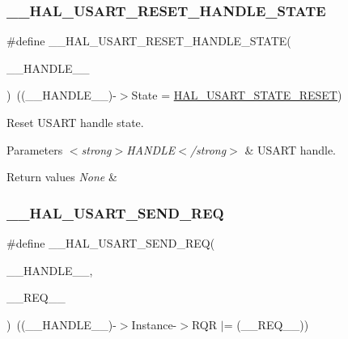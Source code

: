 \subsubsection{\texorpdfstring{\+\_\+\+\_\+\+H\+A\+L\+\_\+\+U\+S\+A\+R\+T\+\_\+\+R\+E\+S\+E\+T\+\_\+\+H\+A\+N\+D\+L\+E\+\_\+\+S\+T\+A\+TE}{\_\_HAL\_USART\_RESET\_HANDLE\_STATE}}
{\footnotesize\ttfamily \#define \+\_\+\+\_\+\+H\+A\+L\+\_\+\+U\+S\+A\+R\+T\+\_\+\+R\+E\+S\+E\+T\+\_\+\+H\+A\+N\+D\+L\+E\+\_\+\+S\+T\+A\+TE(\begin{DoxyParamCaption}\item[{}]{\+\_\+\+\_\+\+H\+A\+N\+D\+L\+E\+\_\+\+\_\+ }\end{DoxyParamCaption})~((\+\_\+\+\_\+\+H\+A\+N\+D\+L\+E\+\_\+\+\_\+)-\/$>$State = \hyperlink{group___u_s_a_r_t___exported___types_gga502e7abdfa6b24f0f6b40cf60c7383c5ab78adc4ded45529f2cf9e74150e49696}{H\+A\+L\+\_\+\+U\+S\+A\+R\+T\+\_\+\+S\+T\+A\+T\+E\+\_\+\+R\+E\+S\+ET})}



Reset U\+S\+A\+RT handle state. 


\begin{DoxyParams}{Parameters}
{\em $<$strong$>$\+H\+A\+N\+D\+L\+E$<$/strong$>$} & U\+S\+A\+RT handle. \\
\hline
\end{DoxyParams}

\begin{DoxyRetVals}{Return values}
{\em None} & \\
\hline
\end{DoxyRetVals}
\mbox{\label{group___u_s_a_r_t___exported___macros_ga3e5b085032deb672887905a7587063e3}} 
\subsubsection{\texorpdfstring{\+\_\+\+\_\+\+H\+A\+L\+\_\+\+U\+S\+A\+R\+T\+\_\+\+S\+E\+N\+D\+\_\+\+R\+EQ}{\_\_HAL\_USART\_SEND\_REQ}}
{\footnotesize\ttfamily \#define \+\_\+\+\_\+\+H\+A\+L\+\_\+\+U\+S\+A\+R\+T\+\_\+\+S\+E\+N\+D\+\_\+\+R\+EQ(\begin{DoxyParamCaption}\item[{}]{\+\_\+\+\_\+\+H\+A\+N\+D\+L\+E\+\_\+\+\_\+,  }\item[{}]{\+\_\+\+\_\+\+R\+E\+Q\+\_\+\+\_\+ }\end{DoxyParamCaption})~((\+\_\+\+\_\+\+H\+A\+N\+D\+L\+E\+\_\+\+\_\+)-\/$>$Instance-\/$>$R\+QR $\vert$= (\+\_\+\+\_\+\+R\+E\+Q\+\_\+\+\_\+))}



